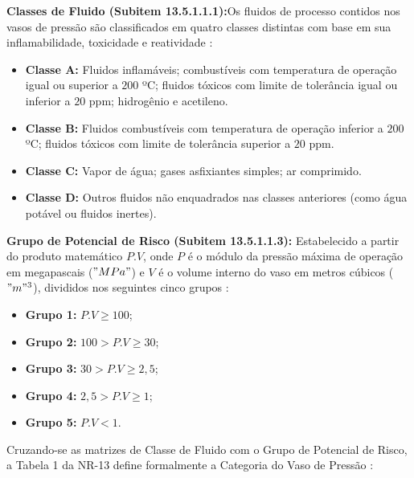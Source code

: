 \textbf{Classes de Fluido (Subitem 13.5.1.1.1):}Os fluidos de processo contidos nos vasos de pressão são classificados em quatro classes distintas com base em sua inflamabilidade, toxicidade e reatividade \cite{brasil_nr13_2022}:

\begin{itemize}
  \item \textbf{Classe A:} Fluidos inflamáveis; combustíveis com temperatura de operação igual ou superior a $200$ ºC; fluidos tóxicos com limite de tolerância igual ou inferior a $20$ ppm; hidrogênio e acetileno.
  \item \textbf{Classe B:} Fluidos combustíveis com temperatura de operação inferior a $200$ ºC; fluidos tóxicos com limite de tolerância superior a $20$ ppm.
  \item \textbf{Classe C:} Vapor de água; gases asfixiantes simples; ar comprimido.
  \item \textbf{Classe D:} Outros fluidos não enquadrados nas classes anteriores (como água potável ou fluidos inertes).
\end{itemize}

\textbf{Grupo de Potencial de Risco (Subitem 13.5.1.1.3):} Estabelecido a partir do produto matemático $P.V$, onde $P$ é o módulo da pressão máxima de operação em megapascais ($"MPa"$) e $V$ é o volume interno do vaso em metros cúbicos ($"m"^3$), divididos nos seguintes cinco grupos \cite{brasil_nr13_2022}:
\begin{itemize}
  \item \textbf{Grupo 1:} $P.V \ge  100$;
  \item \textbf{Grupo 2:} $100 > P.V \ge  30$;
  \item \textbf{Grupo 3:} $30 > P.V \ge  2,5$;
  \item \textbf{Grupo 4:} $2,5 > P.V \ge  1$;
  \item \textbf{Grupo 5:} $P.V < 1$.
\end{itemize}

Cruzando-se as matrizes de Classe de Fluido com o Grupo de Potencial de Risco, a Tabela 1 da NR-13 define formalmente a Categoria do Vaso de Pressão \cite{brasil_nr13_2022}:


